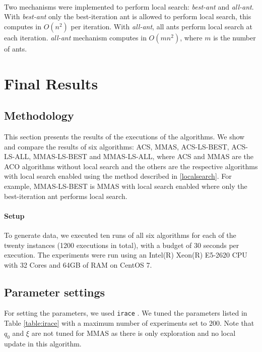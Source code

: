 \documentclass[runningheads]{llncs}
\begin{document}
\paragraph{}

Two mechanisms were implemented to perform local search: \textit{best-ant} and \textit{all-ant}. With \textit{best-ant} only the best-iteration ant is allowed to perform local search, this computes in $O(n^2)$ per iteration. With \textit{all-ant}, all ants perform local search at each iteration. \textit{all-ant} mechanism computes in $O(mn^2)$, where $m$ is the number of ants.

\section{Final Results}

\subsection{Methodology}

This section presents the results of the executions of the algorithms.
We show and compare the results of six algorithms: ACS, MMAS, ACS-LS-BEST, ACS-LS-ALL, MMAS-LS-BEST and MMAS-LS-ALL, where ACS and MMAS are the ACO algorithms without local search and the others are the respective algorithms with local search enabled using the method described in \ref{localsearch}. For example, MMAS-LS-BEST is MMAS with local search enabled where only the best-iteration ant performs local search.

\paragraph{Setup} To generate data, we executed ten runs of all six algorithms for each of the twenty instances \cite{taillard}  (1200 executions in total), with a budget of 30 seconds per execution. The experiments were run using an Intel(R) Xeon(R) E5-2620 CPU with 32 Cores and 64GB of RAM on CentOS 7.

\subsection{Parameter settings}

For setting the parameters, we used \texttt{irace} \cite{irace}.
We tuned the parameters listed in Table \ref{table:irace} with a maximum number of experiments
set to $200$. Note that $q_0$ and $\xi$ are not tuned for MMAS as there is only exploration and no local update in this algorithm.
\end{document}

